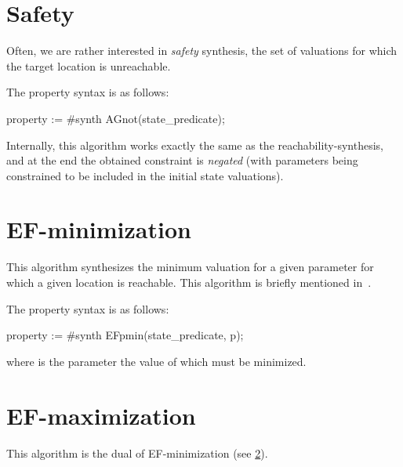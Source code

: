 \section{Safety}\label{ss:mode:EF}

Often, we are rather interested in \emph{safety} synthesis, \ie{} the set of valuations for which the target location is unreachable.

The property syntax is as follows:

\begin{IMITATORproperty}
property := #synth AGnot(state_predicate);
\end{IMITATORproperty}

Internally, this algorithm works exactly the same as the reachability-synthesis, and at the end the obtained constraint is \emph{negated} (with parameters being constrained to be included in the initial state valuations).


\section{EF-minimization}\label{ss:mode:EFmin}

This algorithm synthesizes the minimum valuation for a given parameter for which a given location is reachable.
This algorithm is briefly mentioned in~\cite{ABPV19}.

The property syntax is as follows:

\begin{IMITATORproperty}
property := #synth EFpmin(state_predicate, p);
\end{IMITATORproperty}

where  is the parameter the value of which must be minimized.



\section{EF-maximization}\label{ss:mode:EFmax}

This algorithm is the dual of EF-minimization (see \cref{ss:mode:EFmin}).

